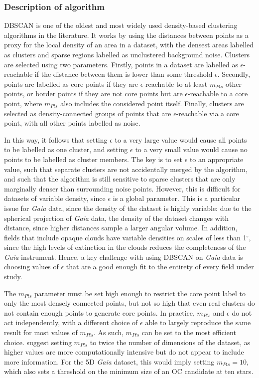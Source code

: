 \subsubsection{Description of algorithm}

DBSCAN \citep{ester_density-based_1996} is one of the oldest and most widely used density-based clustering algorithms in the literature. It works by using the distances between points as a proxy for the local density of an area in a dataset, with the densest areas labelled as clusters and sparse regions labelled as unclustered background noise. Clusters are selected using two parameters. Firstly, points in a dataset are labelled as $\epsilon$-reachable if the distance between them is lower than some threshold $\epsilon$. Secondly, points are labelled as core points if they are $\epsilon$-reachable to at least $m_{Pts}$ other points, or border points if they are not core points but are $\epsilon$-reachable to a core point, where $m_{Pts}$ also includes the considered point itself. Finally, clusters are selected as density-connected groups of points that are $\epsilon$-reachable via a core point, with all other points labelled as noise.

In this way, it follows that setting $\epsilon$ to a very large value would cause all points to be labelled as one cluster, and setting $\epsilon$ to a very small value would cause no points to be labelled as cluster members. The key is to set $\epsilon$ to an appropriate value, such that separate clusters are not accidentally merged by the algorithm, and such that the algorithm is still sensitive to sparse clusters that are only marginally denser than surrounding noise points. However, this is difficult for datasets of variable density, since $\epsilon$ is a global parameter. This is a particular issue for \emph{Gaia} data, since the density of the dataset is highly variable: due to the spherical projection of \emph{Gaia} data, the density of the dataset changes with distance, since higher distances sample a larger angular volume. In addition, fields that include opaque clouds have variable densities on scales of less than 1$^\circ$, since the high levels of extinction in the clouds reduces the completeness of the \emph{Gaia} instrument. Hence, a key challenge with using DBSCAN on \emph{Gaia} data is choosing values of $\epsilon$ that are a good enough fit to the entirety of every field under study.

The $m_{Pts}$ parameter must be set high enough to restrict the core point label to only the most densely connected points, but not so high that even real clusters do not contain enough points to generate core points. In practice, $m_{Pts}$ and $\epsilon$ do not act independently, with a different choice of $\epsilon$ able to largely reproduce the same result for most values of $m_{Pts}$. As such, $m_{Pts}$ can be set to the most efficient choice. \cite{ester_density-based_1996} suggest setting $m_{Pts}$ to twice the number of dimensions of the dataset, as higher values are more computationally intensive but do not appear to include more information. For the 5D \emph{Gaia} dataset, this would imply setting $m_{Pts}=10$, which also sets a threshold on the minimum size of an OC candidate at ten stars.

